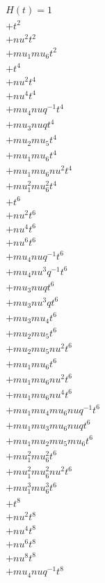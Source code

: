 \begin{align*}
H(t) = {}1 \\
  + t^{2} \\
  + nu^{2} t^{2} \\
  + mu_1 mu_6 t^{2} \\
  + t^{4} \\
  + nu^{2} t^{4} \\
  + nu^{4} t^{4} \\
  + mu_4 nu q^{-1} t^{4} \\
  + mu_3 nu q t^{4} \\
  + mu_2 mu_5 t^{4} \\
  + mu_1 mu_6 t^{4} \\
  + mu_1 mu_6 nu^{2} t^{4} \\
  + mu_1^{2} mu_6^{2} t^{4} \\
  + t^{6} \\
  + nu^{2} t^{6} \\
  + nu^{4} t^{6} \\
  + nu^{6} t^{6} \\
  + mu_4 nu q^{-1} t^{6} \\
  + mu_4 nu^{3} q^{-1} t^{6} \\
  + mu_3 nu q t^{6} \\
  + mu_3 nu^{3} q t^{6} \\
  + mu_3 mu_4 t^{6} \\
  + mu_2 mu_5 t^{6} \\
  + mu_2 mu_5 nu^{2} t^{6} \\
  + mu_1 mu_6 t^{6} \\
  + mu_1 mu_6 nu^{2} t^{6} \\
  + mu_1 mu_6 nu^{4} t^{6} \\
  + mu_1 mu_4 mu_6 nu q^{-1} t^{6} \\
  + mu_1 mu_3 mu_6 nu q t^{6} \\
  + mu_1 mu_2 mu_5 mu_6 t^{6} \\
  + mu_1^{2} mu_6^{2} t^{6} \\
  + mu_1^{2} mu_6^{2} nu^{2} t^{6} \\
  + mu_1^{3} mu_6^{3} t^{6} \\
  + t^{8} \\
  + nu^{2} t^{8} \\
  + nu^{4} t^{8} \\
  + nu^{6} t^{8} \\
  + nu^{8} t^{8} \\
  + mu_4 nu q^{-1} t^{8} \\

\end{align*}
